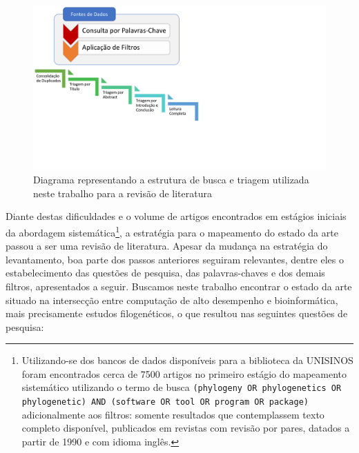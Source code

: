 \documentclass[english,brazilian]{UNISINOSmonografia} %
\newcommand\defaultFigureWidth{0.9}
\begin{document}
\begin{figure}[tb]
\centering%
\begin{minipage}{\defaultFigureWidth\textwidth}
	\caption{Diagrama representando a estrutura de busca e triagem utilizada neste trabalho para a revisão de literatura}
	\label{fig:survey-pipeline}
	\includegraphics[trim=0 160 420 0,clip,width=\textwidth]{survey-pipeline}
\end{minipage}
\end{figure}


Diante destas dificuldades e o volume de artigos encontrados em estágios iniciais da abordagem sistemática\footnote{
	Utilizando-se dos bancos de dados disponíveis para a biblioteca da UNISINOS foram encontrados cerca de 7500 artigos no primeiro estágio do mapeamento sistemático utilizando o termo de busca \texttt{(phylogeny OR phylogenetics OR phylogenetic) AND (software OR tool OR program OR package)} adicionalmente aos filtros: somente resultados que contemplassem texto completo disponível, publicados em revistas com revisão por pares, datados a partir de 1990 e com idioma inglês.
}, a estratégia para o mapeamento do estado da arte passou a ser uma revisão de literatura.
Apesar da mudança na estratégia do levantamento, boa parte dos passos anteriores seguiram relevantes, dentre eles o estabelecimento das questões de pesquisa, das palavras-chaves e dos demais filtros, apresentados a seguir.
Buscamos neste trabalho encontrar o estado da arte situado na intersecção entre computação de alto desempenho e bioinformática, mais precisamente estudos filogenéticos, o que resultou nas seguintes questões de pesquisa:
\end{document}
